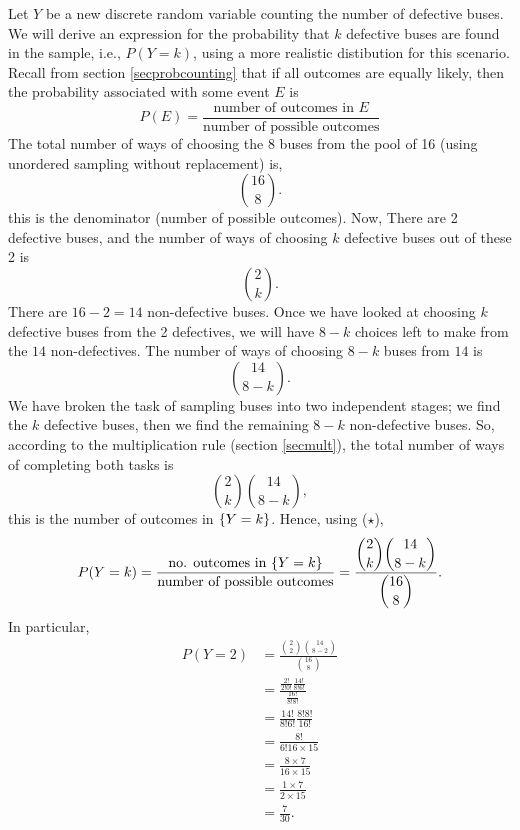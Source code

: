 \noindent Let $Y$ be a new discrete random variable counting the number of defective buses. We will derive an expression for the probability that $k$ defective buses are found in the sample, i.e., $P(Y = k)$, using a more realistic distibution for this scenario. \\

\noindent Recall from section \ref{secprobcounting} that if all outcomes are equally likely, then the probability associated with some event $E$ is \\
\[
P(E) = \frac{\text{number of outcomes in $E$}}{\text{number of possible outcomes}} \tag{$\star$}
\]
\noindent The total number of ways of choosing the 8 buses from the pool of 16 (using unordered sampling without replacement) is,
\[ 
\binom{16}{8}.
\]
this is the denominator (number of possible outcomes). Now,
There are 2 defective buses, and the number of ways of choosing $k$ defective buses out of these 2 is
\[
\binom{2}{k}.
\]
There are $16 - 2 = 14$ non-defective buses. Once we have looked at choosing $k$ defective buses from the 2 defectives, we will have $8-k$ choices left to make from the $14$ non-defectives. The number of ways of choosing $8-k$ buses from $14$ is
\[
\binom{14}{8-k}.
\]
We have broken the task of sampling buses into two independent stages; we find the $k$ defective buses, then we find the remaining $8-k$ non-defective buses. So, according to the multiplication rule (section \ref{secmult}), the total number of ways of completing both tasks is
\[
\binom{2}{k}\binom{14}{8-k},
\]
this is the number of outcomes in $\left\{Y = k\right\}$. Hence, using ($\star$),
\[
P(Y = k) =\frac{\text{no. outcomes in $\left\{Y=k\right\}$}}{\text{number of possible outcomes}} = \frac{\displaystyle{\binom{2}{k}\binom{14}{8-k}}}{\displaystyle{\binom{16}{8}}}.
\]
In particular,
\begin{align*}
P(Y = 2) & = \frac{\binom{2}{2}\binom{14}{8-2}}{\binom{16}{8}} \\
	      & = \frac{\displaystyle{\frac{2!}{2!0!}\frac{14!}{8!6!}}}{\displaystyle{\frac{16!}{8!8!}}} \\
	      & = \frac{14!}{8!6!}\frac{8!8!}{16!} \\
	      & = \frac{8!}{6!16\times15} \tag{cancelling common factors}\\
	      & = \frac{8\times7}{16\times15} \tag{cancelling common factors}\\
	      & = \frac{1\times7}{2\times15}  \tag{cancelling common factors}\\
	      & = \frac{7}{30}.
\end{align*}

